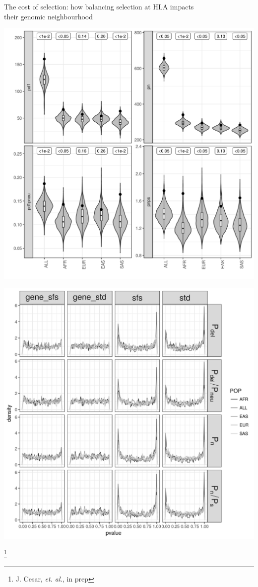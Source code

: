 \documentclass[10pt]{beamer}
\begin{document}
\begin{frame}{\small The cost of selection: how balancing selection at HLA
    impacts  \\ their genomic neighbourhood}
\begin{minipage}{0.35\textwidth}
  \end{minipage}
  \begin{minipage}{0.35\textwidth}
    \includegraphics[width=\textwidth]{./Figures/load_Peri.png}
  \end{minipage}
  \begin{minipage}{0.35\textwidth}
    \includegraphics[width=\textwidth]{./Figures/pval_null_hist.png}
  \end{minipage}
  \let\thefootnote\relax\footnote{J. Cesar, \textit{et. al.}, in prep}
\end{frame}
\end{document}
